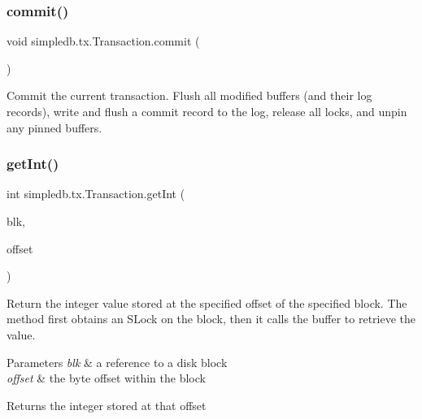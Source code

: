 \subsubsection{\texorpdfstring{commit()}{commit()}}
{\footnotesize\ttfamily void simpledb.\+tx.\+Transaction.\+commit (\begin{DoxyParamCaption}{ }\end{DoxyParamCaption})\hspace{0.3cm}{\ttfamily [inline]}}

Commit the current transaction. Flush all modified buffers (and their log records), write and flush a commit record to the log, release all locks, and unpin any pinned buffers. \mbox{\label{classsimpledb_1_1tx_1_1Transaction_a1ccaf673a876a9c3fc0deda5638172df}} 
\subsubsection{\texorpdfstring{get\+Int()}{getInt()}}
{\footnotesize\ttfamily int simpledb.\+tx.\+Transaction.\+get\+Int (\begin{DoxyParamCaption}\item[{\hyperlink{classsimpledb_1_1file_1_1BlockId}{Block\+Id}}]{blk,  }\item[{int}]{offset }\end{DoxyParamCaption})\hspace{0.3cm}{\ttfamily [inline]}}

Return the integer value stored at the specified offset of the specified block. The method first obtains an S\+Lock on the block, then it calls the buffer to retrieve the value. 
\begin{DoxyParams}{Parameters}
{\em blk} & a reference to a disk block \\
\hline
{\em offset} & the byte offset within the block \\
\hline
\end{DoxyParams}
\begin{DoxyReturn}{Returns}
the integer stored at that offset 
\end{DoxyReturn}
\mbox{\label{classsimpledb_1_1tx_1_1Transaction_a4af20129bd0e8fa7eb26efa308bba6b3}} 

